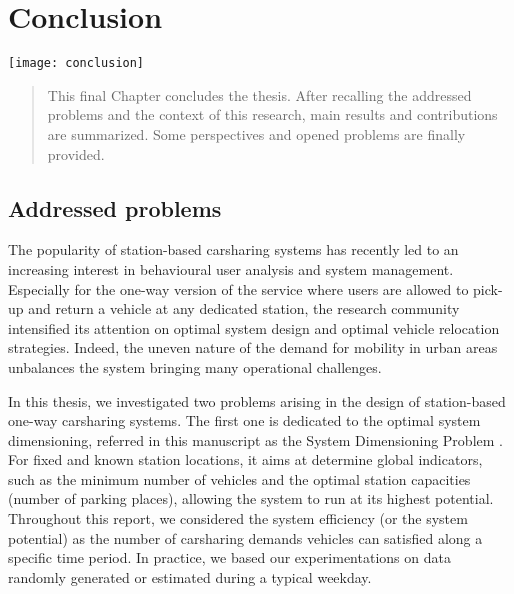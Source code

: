 \chapter{Conclusion} \label{chap:conclusion}
\minitoc
\vfill
\noindent
\begin{minipage}[c]{0.35\linewidth}
\texttt{[image: conclusion]}
\end{minipage}
\hfill
\begin{minipage}[c]{0.6\linewidth}
\begin{abstract}
This final Chapter concludes the thesis.
After recalling the addressed problems and the context of this research, main results and contributions are summarized.
Some perspectives and opened problems are finally provided.
\end{abstract}
\end{minipage}


\newpage
\section{Addressed problems}
The popularity of station-based carsharing systems has recently led to an increasing interest in behavioural user analysis and system management.
Especially for the one-way version of the service where users are allowed to pick-up and return a vehicle at any dedicated station, the research community intensified its attention on optimal system design and optimal vehicle relocation strategies.
Indeed, the uneven nature of the demand for mobility in urban areas unbalances the system bringing many operational challenges.


\medskip
In this thesis, we investigated two problems arising in the design of station-based one-way carsharing systems.
The first one is dedicated to the optimal system dimensioning, referred in this manuscript as the System Dimensioning Problem {\SDP}.
For fixed and known station locations, it aims at determine global indicators, such as the minimum number of vehicles and the optimal station capacities (number of parking places), allowing the system to run at its highest potential.
Throughout this report, we considered the system efficiency (or the system potential) as the number of carsharing demands vehicles can satisfied along a specific time period.
In practice, we based our experimentations on data randomly generated or estimated during a typical weekday.%

